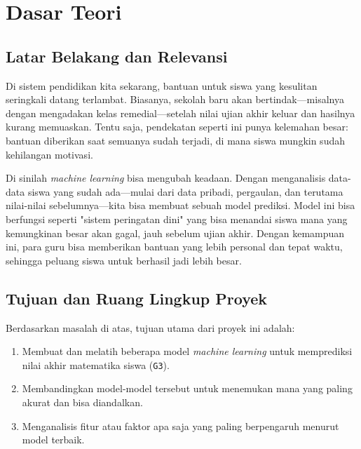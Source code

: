 \chapter*{Dasar Teori}

\section{Latar Belakang dan Relevansi}

Di sistem pendidikan kita sekarang, bantuan untuk siswa yang kesulitan seringkali datang terlambat. Biasanya, sekolah baru akan bertindak---misalnya dengan mengadakan kelas remedial---setelah nilai ujian akhir keluar dan hasilnya kurang memuaskan. Tentu saja, pendekatan seperti ini punya kelemahan besar: bantuan diberikan saat semuanya sudah terjadi, di mana siswa mungkin sudah kehilangan motivasi.

Di sinilah \textit{machine learning} bisa mengubah keadaan. Dengan menganalisis data-data siswa yang sudah ada---mulai dari data pribadi, pergaulan, dan terutama nilai-nilai sebelumnya---kita bisa membuat sebuah model prediksi. Model ini bisa berfungsi seperti "sistem peringatan dini" yang bisa menandai siswa mana yang kemungkinan besar akan gagal, jauh sebelum ujian akhir. Dengan kemampuan ini, para guru bisa memberikan bantuan yang lebih personal dan tepat waktu, sehingga peluang siswa untuk berhasil jadi lebih besar.

\section{Tujuan dan Ruang Lingkup Proyek}

Berdasarkan masalah di atas, tujuan utama dari proyek ini adalah:
\begin{enumerate}
    \item Membuat dan melatih beberapa model \textit{machine learning} untuk memprediksi nilai akhir matematika siswa (\texttt{G3}).
    \item Membandingkan model-model tersebut untuk menemukan mana yang paling akurat dan bisa diandalkan.
    \item Menganalisis fitur atau faktor apa saja yang paling berpengaruh menurut model terbaik.
\end{enumerate}

